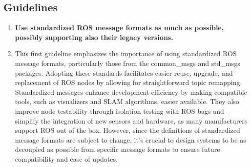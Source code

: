 \documentclass[%
paper=A4,               %
twoside=true,           %
openright,              %
11pt,                   %
bibliography=totoc,     %
titlepage=on,           %
DIV=12,                 %
BCOR=1.5cm,             %
parskip=half,            %
final
]{scrreprt}
\begin{document}
	\subsection{Guidelines}
	\begin{enumerate}[leftmargin=9mm, align=left]
		\item \textbf{Use standardized ROS message formats as much as possible, possibly supporting also their legacy versions.} 
		\item[]This first guideline emphasizes the importance of using standardized ROS message formats, particularly those from the common\_msgs and std\_msgs packages. Adopting these standards facilitates easier reuse, upgrade, and replacement of ROS nodes by allowing for straightforward topic remapping. Standardized messages enhance development efficiency by making compatible tools, such as visualizers and SLAM algorithms, easier available. They also improve node testability through isolation testing with ROS bags and simplify the integration of new sensors and hardware, as many manufacturers support ROS out of the box. However, since the definitions of standardized message formats are subject to change, it's crucial to design systems to be as decoupled as possible from specific message formats to ensure future compatibility and ease of updates. \autocite{malavoltaHowYouArchitect2020}
		

\end{enumerate}
\end{document}

